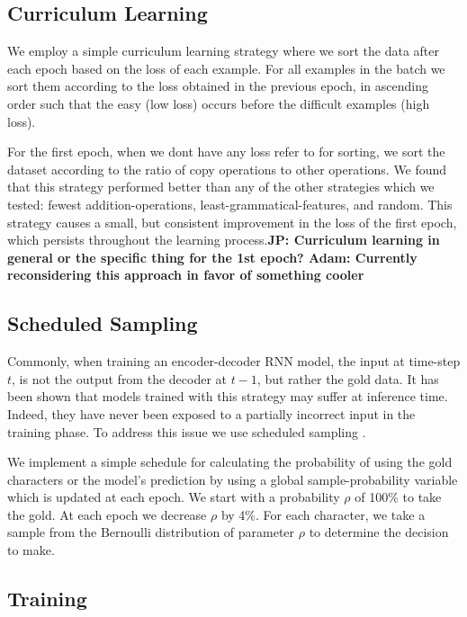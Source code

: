 \documentclass[11pt,a4paper]{article}
\newcommand\jp[1]{\textbf{JP: #1}}
\begin{document}
\subsection{Curriculum Learning}

We employ a simple curriculum learning strategy where we 
sort the data after each epoch based on the loss of each example. For
all examples in the batch we sort them according to the loss obtained
in the previous epoch, in ascending order such that the easy (low
loss) occurs before the difficult examples (high loss).

For the first epoch, when we dont have any loss refer to for sorting,
we sort the dataset according to the ratio of copy operations to other
operations. We found that this strategy performed better than any of
the other strategies which we tested: fewest addition-operations,
least-grammatical-features, and random.  This strategy causes a small,
but consistent improvement in the loss of the first epoch, which
persists throughout the learning process.\jp{Curriculum learning in
general or the specific thing for the 1st epoch? Adam: Currently
reconsidering this approach in favor of something cooler}

\subsection{Scheduled Sampling}

Commonly, when training an encoder-decoder RNN model, the input at
time-step $t$, is not the output from the decoder at $t-1$, but rather
the gold data.  It has been shown that models trained with this
strategy may suffer at inference time. Indeed, they have never been
exposed to a partially incorrect input in the training phase.  To
address this issue we use scheduled sampling
\cite{DBLP:conf/nips/BengioVJS15}.

We implement a simple schedule for calculating the probability of
using the gold characters or the model's prediction by using a global
sample-probability variable which is updated at each epoch. We start
with a probability \(\rho\) of 100\% to take the gold. At each epoch
we decrease \(\rho\) by 4\%. For each character, we take a sample from
the Bernoulli distribution of parameter \(\rho\) to determine the
decision to make.

\subsection{Training}
\end{document}
